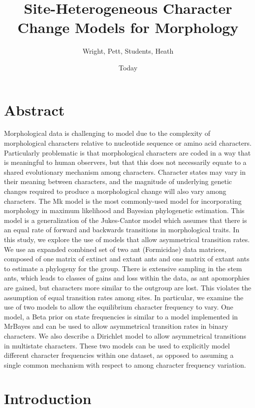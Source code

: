 \documentclass[]{sysbio}
\begin{document}
\title{Site-Heterogeneous Character Change Models for Morphology}
\author{Wright, Pett, Students, Heath}
\date{Today}
\maketitle

\section{Abstract}

Morphological data is challenging to model due to the complexity of morphological characters relative to nucleotide sequence or amino acid characters. 
Particularly problematic is that morphological characters are coded in a way that is meaningful to human observers, but that this does not necessarily equate to a shared evolutionary mechanism among characters.
Character states may vary in their meaning between characters, and  the magnitude of underlying genetic changes required to produce a morphological change will also vary among characters.
The Mk model is the most commonly-used model for incorporating morphology in maximum likelihood and Bayesian phylogenetic estimation.
This model is a generalization of the Jukes-Cantor model which assumes that there is an equal rate of forward and backwards transitions in morphological traits.
In this study, we explore the use of models that allow asymmetrical transition rates.
We use an expanded combined set of two ant (Formicidae) data matrices, composed of one matrix of extinct and extant ants and one matrix of extant ants to estimate a phylogeny for the group.
There is extensive sampling in the stem ants, which leads to classes of gains and loss within the data, as ant apomorphies are gained, but characters more similar to the outgroup are lost. 
This violates the assumption of equal transition rates among sites.
In particular, we examine the use of two models to allow the equilibrium character frequency to vary. 
One model, a Beta prior on state frequencies is similar to a model implemented in MrBayes and can be used to allow asymmetrical transition rates in binary characters.
We also describe a Dirichlet model to allow asymmetrical transitions in multistate characters.
These two models can be used to explicitly model different character frequencies within one dataset, as opposed to assuming a single common mechanism with respect to among character frequency variation.

\section{Introduction}
\end{document}
